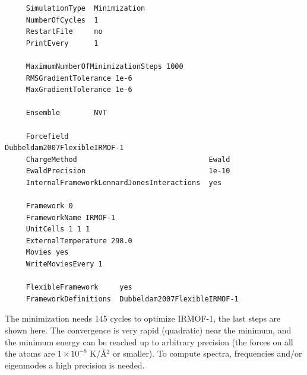 \begin{tiny}
\begin{verbatim}
     SimulationType  Minimization
     NumberOfCycles  1
     RestartFile     no
     PrintEvery      1
     
     MaximumNumberOfMinimizationSteps 1000
     RMSGradientTolerance 1e-6
     MaxGradientTolerance 1e-6
     
     Ensemble        NVT
     
     Forcefield                                 Dubbeldam2007FlexibleIRMOF-1
     ChargeMethod                               Ewald
     EwaldPrecision                             1e-10
     InternalFrameworkLennardJonesInteractions  yes
     
     Framework 0
     FrameworkName IRMOF-1
     UnitCells 1 1 1
     ExternalTemperature 298.0
     Movies yes
     WriteMoviesEvery 1
     
     FlexibleFramework     yes
     FrameworkDefinitions  Dubbeldam2007FlexibleIRMOF-1
\end{verbatim}
\end{tiny}
The minimization needs 145 cycles to optimize IRMOF-1, the last steps are shown here. The convergence is very rapid (quadratic) near the minimum,
and the minimum energy can be reached up to arbitrary precision (the forces on all the atoms are $1\times10^{-8}$ K/\AA$^2$
or smaller). To compute spectra, frequencies and/or eigenmodes a high precision is needed.
